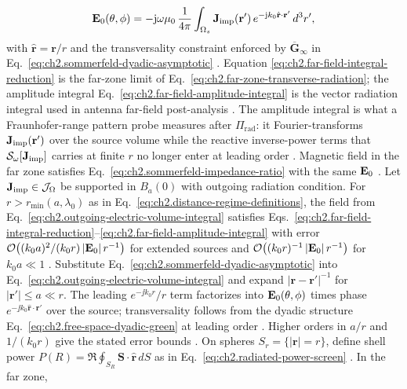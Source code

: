 \begin{equation}
\label{eq:ch2.far-field-amplitude-integral}
\mathbf{E}_0(\theta,\phi)
=
-\mathrm{j}\omega\mu_0\,\frac{1}{4\pi}
\int_{\Omega_s}
\mathbf{J}_{\mathrm{imp}}(\mathbf{r}')\,
e^{-\mathrm{j} k_0\hat{\mathbf{r}}\cdot\mathbf{r}'}\,d^{3}r',
\end{equation}
with \(\hat{\mathbf{r}}=\mathbf{r}/r\) and the transversality constraint enforced by
\(\overline{\mathbf{G}}_{\infty}\) in Eq.~\eqref{eq:ch2.sommerfeld-dyadic-asymptotic}
\cite{stratton1941}. Equation
\eqref{eq:ch2.far-field-integral-reduction} is the far-zone limit of
Eq.~\eqref{eq:ch2.far-zone-transverse-radiation}; the amplitude integral
Eq.~\eqref{eq:ch2.far-field-amplitude-integral} is the vector radiation integral used in
antenna far-field post-analysis \cite{harrington2001}. The amplitude integral is what a
Fraunhofer-range pattern probe measures after $\Pi_{\mathrm{rad}}$: it Fourier-transforms
$\mathbf{J}_{\mathrm{imp}}(\mathbf{r}')$ over the source volume while the reactive inverse-power terms that
$\mathcal{S}_\omega[\mathbf{J}_{\mathrm{imp}}]$ carries at finite $r$ no longer enter at leading order
\cite{harrington2001}. Magnetic field in the far zone
satisfies Eq.~\eqref{eq:ch2.sommerfeld-impedance-ratio} with the same \(\mathbf{E}_0\)
\cite{stratton1941}.
\label{thm:ch2.far-field-approximation}
Let \(\mathbf{J}_{\mathrm{imp}}\in\mathcal{J}_\Omega\) be supported in \(B_a(0)\) with outgoing radiation condition.
For \(r> r_{\min}(a,\lambda_0)\) as in Eq.~\eqref{eq:ch2.distance-regime-definitions},
the field from Eq.~\eqref{eq:ch2.outgoing-electric-volume-integral} satisfies
Eqs.~\eqref{eq:ch2.far-field-integral-reduction}--\eqref{eq:ch2.far-field-amplitude-integral}
with error \(\mathcal{O}\big((k_0 a)^{2}/(k_0 r)\,|\mathbf{E}_0|\,r^{-1}\big)\) for extended
sources and \(\mathcal{O}\big((k_0 r)^{-1}\,|\mathbf{E}_0|\,r^{-1}\big)\) for \(k_0 a\ll 1\)
\cite{stratton1941}.
Substitute Eq.~\eqref{eq:ch2.sommerfeld-dyadic-asymptotic} into
Eq.~\eqref{eq:ch2.outgoing-electric-volume-integral} and expand
\(|\mathbf{r}-\mathbf{r}'|^{-1}\) for \(|\mathbf{r}'|\le a\ll r\). The leading
\(e^{-\jj k_0 r}/r\) term factorizes into \(\mathbf{E}_0(\theta,\phi)\) times phase
\(e^{-\jj k_0\hat{\mathbf{r}}\cdot\mathbf{r}'}\) over the source; transversality follows
from the dyadic structure Eq.~\eqref{eq:ch2.free-space-dyadic-green} at leading order
\cite{stratton1941}. Higher orders in \(a/r\) and \(1/(k_0 r)\) give the
stated error bounds \cite{jackson1999}.
On spheres \(S_r=\{|\mathbf{r}|=r\}\), define shell power
\(P(R)=\Re\oint_{S_R}\mathbf{S}\cdot\hat{\mathbf{r}}\,dS\) as in
Eq.~\eqref{eq:ch2.radiated-power-screen} \cite{stratton1941}. In the far zone,
